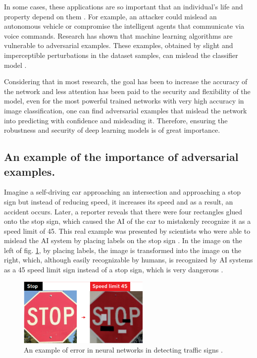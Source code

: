 \documentclass[lettersize,journal]{IEEEtran}
\begin{document}
In some cases, these applications are so important that an individual's life and property depend on them \cite{Madry2018TowardsDL}. For example, an attacker could mislead an autonomous vehicle or compromise the intelligent agents that communicate via voice commands. Research has shown that machine learning algorithms are vulnerable to adversarial examples. These examples, obtained by slight and imperceptible perturbations in the dataset samples, can mislead the classifier model \cite{Akhtar2018ThreatOA}. 

Considering that in most research, the goal has been to increase the accuracy of the network and less attention has been paid to the security and flexibility of the model, even for the most powerful trained networks with very high accuracy in image classification, one can find adversarial examples that mislead the network into predicting with confidence and misleading it. Therefore, ensuring the robustness and security of deep learning models is of great importance.

\subsection*{An example of the importance of adversarial examples.}
Imagine a self-driving car approaching an intersection and approaching a stop sign but instead of reducing speed, it increases its speed and as a result, an accident occurs. Later, a reporter reveals that there were four rectangles glued onto the stop sign, which caused the AI of the car to mistakenly recognize it as a speed limit of 45. This real example was presented by scientists who were able to mislead the AI system by placing labels on the stop sign \cite{Evtimov2017RobustPA}. 
In the image on the left of fig. \ref{stop_speed}, by placing labels, the image is transformed into the image on the right, which, although easily recognizable by humans, is recognized by AI systems as a 45 speed limit sign instead of a stop sign, which is very dangerous \cite{Heaven2019DLFool}.

\begin{figure}[!t]
\centering
\includegraphics[width=2.5in]{stop_speed.PNG}
\caption{An example of error in neural networks in detecting traffic signs \cite{Evtimov2017RobustPA}.}
\label{stop_speed}
\end{figure}
\end{document}
